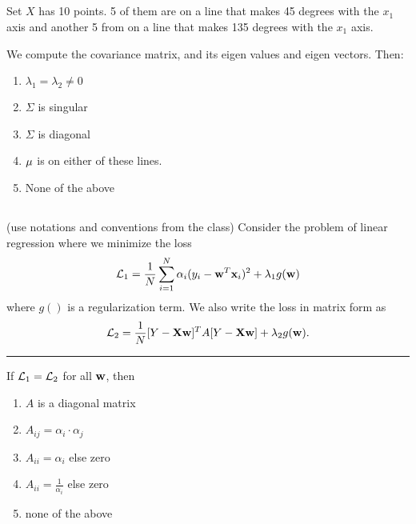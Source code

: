 \begin{frame}
\section{}
Set $X$ has 10 points. 5 of them are on a line that makes 45 degrees with the $x_1$ axis and another 5 from on a line that makes 135 degrees with the $x_1$ axis.

We compute the covariance matrix, and its eigen values and eigen vectors. Then:

\begin{enumerate}
\item $\lambda_1 = \lambda_2 \neq 0$
\item $\Sigma$ is singular
\item $\Sigma$ is diagonal
\item ${\bf \mu}$ is on either of these lines.
\item None of the above   %
\end{enumerate}
\end{frame}

\begin{frame}
\section{}
(use notations  and conventions from the class) Consider the problem of linear regression where we
minimize the loss
\[{\cal L}_1 = \frac{1}{N}\sum_{i=1}^N \alpha_i (y_i - {\bf w}^T{\bf x}_i)^2 + \lambda_1 g({\bf w})\] where $g()$ is a regularization term. We also write the loss in matrix form as \[ {\cal L}_2 = \frac{1}{N} [Y-{\bf X}{\bf w}]^TA[Y-{\bf X}{\bf w}] + \lambda_2 g({\bf w}). \]

\hrule
If ${\cal L}_1 = {\cal L}_2$ for all $\bf{w}$, then
\begin{enumerate}
\item $A$ is a diagonal matrix    %
\item $A_{ij} = \alpha_i \cdot \alpha_j $
\item $A_{ii} = \alpha_i$ else zero   %
\item $A_{ii} = \frac{1}{\alpha_i}$ else zero
\item none of the above
\end{enumerate}
\end{frame}

